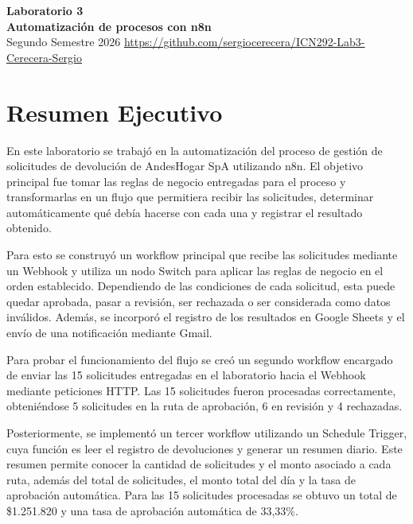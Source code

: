 \documentclass[11pt]{article}
\begin{document}


\begin{center}
    \Large{\textbf{Laboratorio 3}} \\
    \textbf{Automatización de procesos con n8n} \\
    \large{Segundo Semestre 2026}
    \url{https://github.com/sergiocerecera/ICN292-Lab3-Cerecera-Sergio}
\end{center}

\vspace{0.5cm}



\section*{Resumen Ejecutivo}

En este laboratorio se trabajó en la automatización del proceso de gestión de solicitudes de devolución de AndesHogar SpA utilizando n8n. El objetivo principal fue tomar las reglas de negocio entregadas para el proceso y transformarlas en un flujo que permitiera recibir las solicitudes, determinar automáticamente qué debía hacerse con cada una y registrar el resultado obtenido.

Para esto se construyó un workflow principal que recibe las solicitudes mediante un Webhook y utiliza un nodo Switch para aplicar las reglas de negocio en el orden establecido. Dependiendo de las condiciones de cada solicitud, esta puede quedar aprobada, pasar a revisión, ser rechazada o ser considerada como datos inválidos. Además, se incorporó el registro de los resultados en Google Sheets y el envío de una notificación mediante Gmail.

Para probar el funcionamiento del flujo se creó un segundo workflow encargado de enviar las 15 solicitudes entregadas en el laboratorio hacia el Webhook mediante peticiones HTTP. Las 15 solicitudes fueron procesadas correctamente, obteniéndose 5 solicitudes en la ruta de aprobación, 6 en revisión y 4 rechazadas.

Posteriormente, se implementó un tercer workflow utilizando un Schedule Trigger, cuya función es leer el registro de devoluciones y generar un resumen diario. Este resumen permite conocer la cantidad de solicitudes y el monto asociado a cada ruta, además del total de solicitudes, el monto total del día y la tasa de aprobación automática. Para las 15 solicitudes procesadas se obtuvo un total de \$1.251.820 y una tasa de aprobación automática de 33,33\%.
\end{document}
